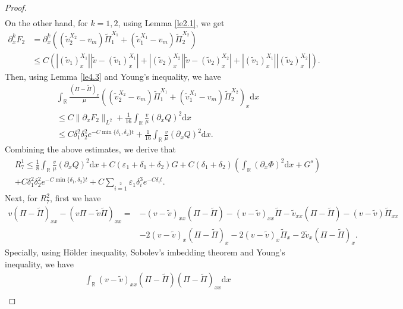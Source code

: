 \documentclass[10pt,a4paper]{amsart}
\newcommand{\dif}{\mathrm{d}}
\begin{document}
\begin{proof}
\begin{align*}
\end{align*}
On the other hand, for $k=1,2$, using Lemma \ref{le2.1}, we get
\begin{align*}
\partial_x^{k}F_2&=
\partial_x^{k}\left(\left(\widetilde{v}^{X_2}_2-v_m\right)\widetilde{\Pi}_1^{X_1}
+\left(\widetilde{v}^{X_1}_1-v_m\right)\widetilde{\Pi}_2^{X_2}\right)\\
&\le
C\left(|(\widetilde{v}_1)^{X_1}_x||\widetilde{v}-(\widetilde{v}_1)^{X_1}_x|
+|(\widetilde{v}_2)^{X_2}_x||\widetilde{v}-(\widetilde{v}_2)^{X_2}_x|
+|(\widetilde{v}_1)^{X_1}_x||(\widetilde{v}_2)^{X_2}_x|\right).
\end{align*}
Then, using Lemma \ref{le4.3} and Young's inequality, we have
\begin{align*}
 &\int_\mathbb{R}\frac{(\Pi-\widetilde{\Pi})_{x}}{\mu}
 \left(\left(\widetilde{v}^{X_2}_2-v_m\right)\widetilde{\Pi}_1^{X_1}
+\left(\widetilde{v}^{X_1}_1-v_m\right)\widetilde{\Pi}_2^{X_2}\right)_x\dif x\\
&\le C\|\partial_x F_2\|_{L^2} +\frac{1}{16}\int_\mathbb{R}\frac{v}{\mu}(\partial_xQ)^2\dif x\\
&\le C\delta_1^2\delta_2^2e^{-C\min\{\delta_1,\delta_2\}t}
+\frac{1}{16}\int_\mathbb{R}\frac{v}{\mu}(\partial_xQ)^2\dif x.
\end{align*}
Combining the above estimates, we derive that
\begin{align*}
 &R_7^1 \le \frac{1}{8}\int_\mathbb{R}\frac{v}{\mu}(\partial_xQ)^2\dif x
 +C(\varepsilon_1+\delta_1+\delta_2)G
 +C(\delta_1+\delta_2)\left(\int_\mathbb{R}(\partial_x\Phi)^2\dif x+G^s\right)\\
 &+C\delta_1^2\delta_2^2e^{-C\min\{\delta_1,\delta_2\}t}
 +C\sum\limits_{i=1}\limits^2\varepsilon_1 \delta_i^3e^{-C\delta_i t}.
\end{align*}
Next, for $R_7^2$, first we have
\begin{align*}
v(\Pi-\widetilde{\Pi})_{xx}-(v\Pi-\widetilde{v}\widetilde{\Pi})_{xx}=
&-(v-\widetilde{v})_{xx}(\Pi-\widetilde{\Pi})
-(v-\widetilde{v})_{xx}\widetilde{\Pi}-\widetilde{v}_{xx}(\Pi-\widetilde{\Pi})
-(v-\widetilde{v})\widetilde{\Pi}_{xx}\\
&-2(v-\widetilde{v})_{x}(\Pi-\widetilde{\Pi})_{x}-2(v-\widetilde{v})_{x}\widetilde{\Pi}_{x}
-2\widetilde{v}_{x}(\Pi-\widetilde{\Pi})_{x}.
\end{align*}
Specially, using H\"{o}lder inequality, Sobolev's imbedding theorem and Young's inequality, we have
\begin{align*}
&\int_\mathbb{R}(v-\widetilde{v})_{xx}(\Pi-\widetilde{\Pi})(\Pi-\widetilde{\Pi})_{xx}\dif x\\

\end{align*}
\end{proof}
\end{document}
